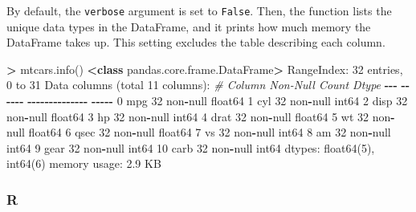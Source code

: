 \documentclass[
]{book}
\newenvironment{Shaded}{\begin{snugshade}}{\end{snugshade}}
\newcommand{\CommentTok}[1]{\textcolor[rgb]{0.56,0.35,0.01}{\textit{#1}}}
\newcommand{\DecValTok}[1]{\textcolor[rgb]{0.00,0.00,0.81}{#1}}
\newcommand{\FloatTok}[1]{\textcolor[rgb]{0.00,0.00,0.81}{#1}}
\newcommand{\KeywordTok}[1]{\textcolor[rgb]{0.13,0.29,0.53}{\textbf{#1}}}
\newcommand{\NormalTok}[1]{#1}
\newcommand{\OperatorTok}[1]{\textcolor[rgb]{0.81,0.36,0.00}{\textbf{#1}}}
\newcommand{\StringTok}[1]{\textcolor[rgb]{0.31,0.60,0.02}{#1}}
\begin{document}
By default, the \texttt{verbose} argument is set to \texttt{False}. Then, the function lists the unique data types in the DataFrame, and it prints how much memory the DataFrame takes up. This setting excludes the table describing each column.

\begin{Shaded}
\begin{Highlighting}[]
\OperatorTok{\textgreater{}}\NormalTok{ mtcars.info()}
\OperatorTok{\textless{}}\KeywordTok{class} \StringTok{\textquotesingle{}pandas.core.frame.DataFrame\textquotesingle{}}\OperatorTok{\textgreater{}}
\NormalTok{RangeIndex: }\DecValTok{32}\NormalTok{ entries, }\DecValTok{0}\NormalTok{ to }\DecValTok{31}
\NormalTok{Data columns (total }\DecValTok{11}\NormalTok{ columns):}
 \CommentTok{\#   Column  Non{-}Null Count  Dtype  }
\OperatorTok{{-}{-}{-}}  \OperatorTok{{-}{-}{-}{-}{-}{-}}  \OperatorTok{{-}{-}{-}{-}{-}{-}{-}{-}{-}{-}{-}{-}{-}{-}}  \OperatorTok{{-}{-}{-}{-}{-}}  
 \DecValTok{0}\NormalTok{   mpg     }\DecValTok{32}\NormalTok{ non}\OperatorTok{{-}}\NormalTok{null     float64}
 \DecValTok{1}\NormalTok{   cyl     }\DecValTok{32}\NormalTok{ non}\OperatorTok{{-}}\NormalTok{null     int64  }
 \DecValTok{2}\NormalTok{   disp    }\DecValTok{32}\NormalTok{ non}\OperatorTok{{-}}\NormalTok{null     float64}
 \DecValTok{3}\NormalTok{   hp      }\DecValTok{32}\NormalTok{ non}\OperatorTok{{-}}\NormalTok{null     int64  }
 \DecValTok{4}\NormalTok{   drat    }\DecValTok{32}\NormalTok{ non}\OperatorTok{{-}}\NormalTok{null     float64}
 \DecValTok{5}\NormalTok{   wt      }\DecValTok{32}\NormalTok{ non}\OperatorTok{{-}}\NormalTok{null     float64}
 \DecValTok{6}\NormalTok{   qsec    }\DecValTok{32}\NormalTok{ non}\OperatorTok{{-}}\NormalTok{null     float64}
 \DecValTok{7}\NormalTok{   vs      }\DecValTok{32}\NormalTok{ non}\OperatorTok{{-}}\NormalTok{null     int64  }
 \DecValTok{8}\NormalTok{   am      }\DecValTok{32}\NormalTok{ non}\OperatorTok{{-}}\NormalTok{null     int64  }
 \DecValTok{9}\NormalTok{   gear    }\DecValTok{32}\NormalTok{ non}\OperatorTok{{-}}\NormalTok{null     int64  }
 \DecValTok{10}\NormalTok{  carb    }\DecValTok{32}\NormalTok{ non}\OperatorTok{{-}}\NormalTok{null     int64  }
\NormalTok{dtypes: float64(}\DecValTok{5}\NormalTok{), int64(}\DecValTok{6}\NormalTok{)}
\NormalTok{memory usage: }\FloatTok{2.9}\NormalTok{ KB}
\end{Highlighting}
\end{Shaded}

\hypertarget{r-14}{%
\subsubsection*{R}\label{r-14}}
\end{document}
